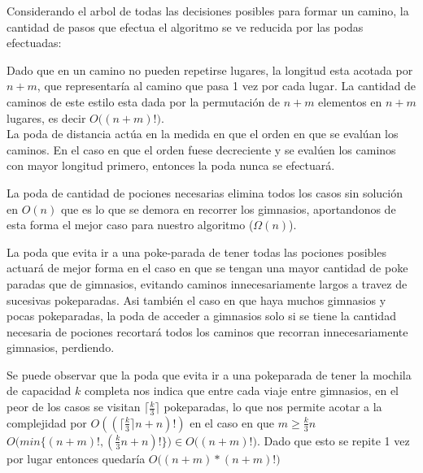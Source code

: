 Considerando el arbol de todas las decisiones posibles para formar un camino, la cantidad de pasos que efectua el algoritmo se ve reducida por las podas efectuadas:

Dado que en un camino no pueden repetirse lugares, la longitud esta acotada por $n+m$, que representaría al camino que pasa 1 vez por cada lugar. La cantidad de caminos de este estilo esta dada por la permutación de $n+m$ elementos en $n+m$ lugares, es decir $O\Big ( (n+m)! \Big)$.\\

La poda de distancia actúa en la medida en que el orden en que se evalúan los caminos. En el caso en que el orden fuese decreciente y se evalúen los caminos con mayor longitud primero, entonces la poda nunca se efectuará.

La poda de cantidad de pociones necesarias elimina todos los casos sin solución en $O(n)$ que es lo que se demora en recorrer los gimnasios, aportandonos de esta forma el mejor caso para nuestro algoritmo ($\Omega(n)$).

La poda que evita ir a una poke-parada de tener todas las pociones posibles actuará de mejor forma en el caso en que se tengan una mayor cantidad de poke paradas que de gimnasios, evitando caminos innecesariamente largos a travez de sucesivas pokeparadas. Asi también el caso en que haya muchos gimnasios y pocas pokeparadas, la poda de acceder a gimnasios solo si se tiene la cantidad necesaria de pociones recortará todos los caminos que recorran innecesariamente gimnasios, perdiendo. 

Se puede observar que la poda que evita ir a una pokeparada de tener la mochila de capacidad $k$ completa nos indica que entre cada viaje entre gimnasios, en el peor de los casos se visitan $\lceil{\frac{k}{3}}\rceil$ pokeparadas, lo que nos permite acotar a la complejidad por $O((\lceil{\frac{k}{3}}\rceil n + n)!)$ en el caso en que $m\geq\frac{k}{3}n$ $O\Big(min\big\{ (n+m)!, (\frac{k}{3}n + n)! \big\}\Big) \in O\big((n+m)!\big)$. Dado que esto se repite 1 vez por lugar entonces quedaría $O\big((n+m) * (n+m)!\big)$
 